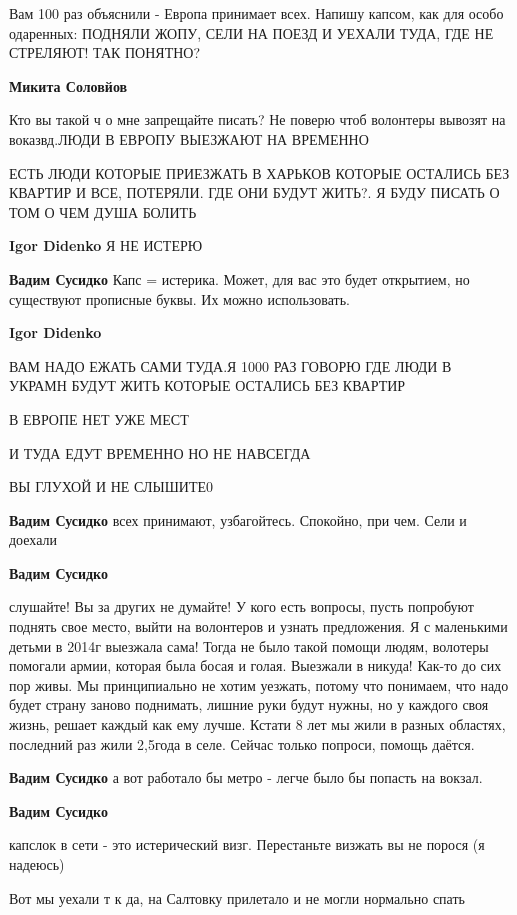 \begin{itemize}
\begin{itemize}
Вам 100 раз объяснили - Европа принимает всех. Напишу капсом, как для особо
одаренных: ПОДНЯЛИ ЖОПУ, СЕЛИ НА ПОЕЗД И УЕХАЛИ ТУДА, ГДЕ НЕ СТРЕЛЯЮТ! ТАК
ПОНЯТНО?

\textbf{Микита Соловйов} 

Кто вы такой ч о мне запрещайте писать? Не поверю чтоб волонтеры вывозят на
воказвд.ЛЮДИ В ЕВРОПУ ВЫЕЗЖАЮТ НА ВРЕМЕННО

ЕСТЬ ЛЮДИ КОТОРЫЕ ПРИЕЗЖАТЬ В ХАРЬКОВ КОТОРЫЕ ОСТАЛИСЬ БЕЗ КВАРТИР И ВСЕ,
ПОТЕРЯЛИ. ГДЕ ОНИ БУДУТ ЖИТЬ?. Я БУДУ ПИСАТЬ О ТОМ О ЧЕМ ДУША БОЛИТЬ

\textbf{Igor Didenko} Я НЕ ИСТЕРЮ

\textbf{Вадим Сусидко} Капс = истерика. Может, для вас это будет открытием, но существуют прописные буквы. Их можно использовать.

\textbf{Igor Didenko} 

ВАМ НАДО ЕЖАТЬ САМИ ТУДА.Я 1000 РАЗ ГОВОРЮ ГДЕ ЛЮДИ В УКРАМН БУДУТ ЖИТЬ КОТОРЫЕ ОСТАЛИСЬ БЕЗ КВАРТИР

В ЕВРОПЕ НЕТ УЖЕ МЕСТ

И ТУДА ЕДУТ ВРЕМЕННО НО НЕ НАВСЕГДА

ВЫ ГЛУХОЙ И НЕ СЛЫШИТЕ0

\textbf{Вадим Сусидко} всех принимают, узбагойтесь. Спокойно, при чем. Сели и доехали

\textbf{Вадим Сусидко} 

слушайте! Вы за других не думайте! У кого есть вопросы, пусть попробуют поднять
свое место, выйти на волонтеров и узнать предложения. Я с маленькими детьми в
2014г выезжала сама! Тогда не было такой помощи людям, волотеры помогали армии,
которая была босая и голая. Выезжали в никуда! Как-то до сих пор живы. Мы
принципиально не хотим уезжать, потому что понимаем, что надо будет страну
заново поднимать, лишние руки будут нужны, но у каждого своя жизнь, решает
каждый как ему лучше. Кстати 8 лет мы жили в разных областях, последний раз
жили 2,5года в селе. Сейчас только попроси, помощь даётся.

\textbf{Вадим Сусидко} а вот работало бы метро - легче было бы попасть на вокзал.

\textbf{Вадим Сусидко} 

капслок в сети - это истерический визг. Перестаньте визжать вы не порося (я
надеюсь)

Вот мы уехали т к да, на Салтовку прилетало и не могли нормально спать


\end{itemize}
\end{itemize}
